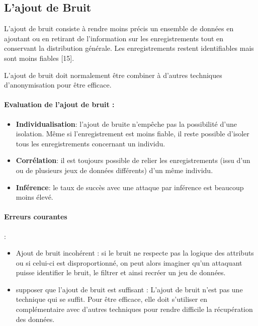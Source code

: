 \subsection{L’ajout de Bruit} 

L’ajout de bruit consiste à rendre moins précis un ensemble de données en ajoutant ou en retirant de l’information sur les enregistrements tout en conservant la distribution générale. Les enregistrements restent identifiables mais sont moins fiables [15]. 

L’ajout de bruit doit normalement être combiner à d’autres techniques d’anonymisation pour être efficace.  

\paragraph{Evaluation de l’ajout de bruit : }

\begin{itemize}
    \item  \textbf{Individualisation}: l’ajout de bruite n’empêche pas la possibilité d’une isolation. Même si l’enregistrement est moins fiable, il reste possible d’isoler tous les enregistrements concernant un individu. 
    
    \item  \textbf{Corrélation}: il est toujours possible de relier les enregistrements (issu d’un ou de plusieurs jeux de données différents) d’un même individu. 
    
    \item \textbf{Inférence}: le taux de succès avec une attaque par inférence est beaucoup moins élevé. 
\end{itemize}

\paragraph{Erreurs courantes}:   
\begin{itemize}
    \item Ajout de bruit incohérent : si le bruit ne respecte pas la logique des attributs ou si celui-ci est disproportionné, on peut alors imaginer qu'un attaquant puisse identifier le bruit, le filtrer et ainsi recréer un jeu de données. 
    \item supposer que l’ajout de bruit est suffisant : L'ajout de bruit n'est pas une technique qui se suffit. Pour être efficace, elle doit s'utiliser en complémentaire avec d'autres techniques pour rendre difficile la récupération des données.
\end{itemize}

